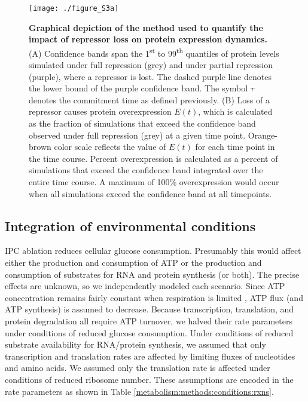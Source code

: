 \begin{figure}[h!]
\centering
\texttt{[image: ./figure\_S3a]}
\caption[Evaluation of protein overexpression metric.]{\textbf{Graphical depiction of the method used to quantify the impact of repressor loss on protein expression dynamics.} (A) Confidence bands span the 1\textsuperscript{st} to 99\textsuperscript{th} quantiles of protein levels simulated under full repression (grey) and under partial repression (purple), where a repressor is lost. The dashed purple line denotes the lower bound of the purple confidence band. The symbol $\tau$ denotes the commitment time as defined previously. (B) Loss of a repressor causes protein overexpression $E(t)$, which is calculated as the fraction of simulations that exceed the confidence band observed under full repression (grey) at a given time point. Orange-brown color scale reflects the value of $E(t)$ for each time point in the time course. Percent overexpression is calculated as a percent of simulations that exceed the confidence band integrated over the entire time course. A maximum of 100\% overexpression would occur when all simulations exceed the confidence band at all timepoints.}
\label{fig:metabolism:figS3a}
\end{figure}

\subsection{Integration of environmental conditions}
\label{metabolism:methods:conditions}

IPC ablation reduces cellular glucose consumption. Presumably this would affect either the production and consumption of ATP or the production and consumption of substrates for RNA and protein synthesis (or both). The precise effects are unknown, so we independently modeled each scenario. Since ATP concentration remains fairly constant when respiration is limited \cite{Brown1992}, ATP flux (and ATP synthesis) is assumed to decrease. Because transcription, translation, and protein degradation all require ATP turnover, we halved their rate parameters under conditions of reduced glucose consumption. Under conditions of reduced substrate availability for RNA/protein synthesis, we assumed that only transcription and translation rates are affected by limiting fluxes of nucleotides and amino acids. We assumed only the translation rate is affected under conditions of reduced ribosome number. These assumptions are encoded in the rate parameters as shown in Table \ref{metabolism:methods:conditions:rxns}.


